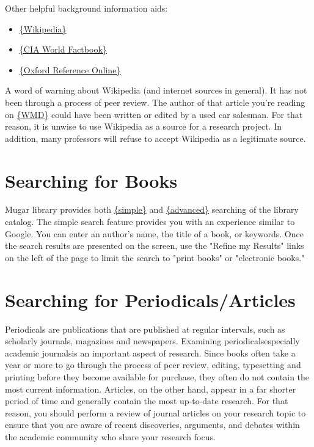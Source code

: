 \documentclass[book]{memoir}
\begin{document}
Other helpful background information aids:

\begin{itemize}
\item \href{http://www.wikipedia.org}{\{Wikipedia\}}

\item \href{http://www.cia.gov/library/publications/the-world-factbook/}{\{CIA World Factbook\}}

\item \href{[http://www.oxfordreference.com.ezproxy.bu.edu}{\{Oxford Reference Online\}}

\end{itemize}
A word of warning about Wikipedia (and internet sources in general). It has not been through a process of peer review. The author of that article you're reading on \href{http://en.wikipedia.org/wiki/Weapon_of_mass_destruction}{\{WMD\}} could have been written or edited by a used car salesman. For that reason, it is unwise to use Wikipedia as a source for a research project. In addition, many professors will refuse to accept Wikipedia as a legitimate source. 

\section{Searching for Books}

Mugar library provides both \href{http://www.bu.edu/library}{\{simple\}} and \href{http://buprimo.hosted.exlibrisgroup.com:1701/primo_library/libweb/action/search.do?tab=default_tab&mode=Advanced&scp.scps=scope%3a%28BOSU%29%2cscope%3a%28BU_OAI%29%2cprimo_central_multiple_fe&vid=BU}{\{advanced\}} searching of the library catalog. The simple search feature provides you with an experience similar to Google. You can enter an author's name, the title of a book, or keywords. Once the search results are presented on the screen, use the "Refine my Results" links on the left of the page to limit the search to "print books" or "electronic books."

\section{Searching for Periodicals/Articles}

Periodicals are publications that are published at regular intervals, such as scholarly journals, magazines and newspapers. Examining periodicals\textemdash especially academic journals\textemdash is an important aspect of research. Since books often take a year or more to go through the process of peer review, editing, typesetting and printing before they become available for purchase, they often do not contain the most current information. Articles, on the other hand, appear in a far shorter period of time and generally contain the most up-to-date research. For that reason, you should perform a review of journal articles on your research topic to ensure that you are aware of recent discoveries, arguments, and debates within the academic community who share your research focus.
\end{document}
